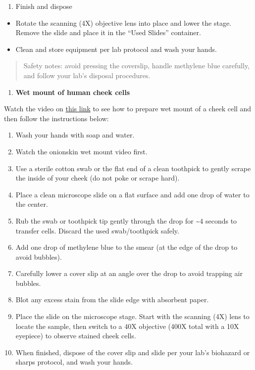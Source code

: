 \documentclass[
  letterpaper,
  DIV=11,
  numbers=noendperiod]{scrreprt}
\providecommand{\tightlist}{%
  \setlength{\itemsep}{0pt}\setlength{\parskip}{0pt}}
\begin{document}
\begin{enumerate}
\def\labelenumi{\arabic{enumi}.}
\setcounter{enumi}{6}
\tightlist
\item
  Finish and dispose
\end{enumerate}

\begin{itemize}
\item
  Rotate the scanning (4X) objective lens into place and lower the
  stage. Remove the slide and place it in the ``Used Slides'' container.
\item
  Clean and store equipment per lab protocol and wash your hands.
\end{itemize}

\begin{quote}
Safety notes: avoid pressing the coverslip, handle methylene blue
carefully, and follow your lab's disposal procedures.
\end{quote}

\begin{enumerate}
\def\labelenumi{\Roman{enumi}.}
\setcounter{enumi}{1}
\tightlist
\item
  \textbf{Wet mount of human cheek cells}
\end{enumerate}

Watch the video on
\href{Watch\%20the\%20video\%20on\%20this\%20link\%20to\%20see\%20how\%20to\%20prepare\%20wet\%20mount\%20of\%20an\%20onion\%20skin\%20and\%20then\%20follow\%20the\%20instructions\%20below:}{this
link} to see how to prepare wet mount of a cheek cell and then follow
the instructions below:

\begin{enumerate}
\def\labelenumi{\arabic{enumi}.}
\item
  Wash your hands with soap and water.
\item
  Watch the onionskin wet mount video first.
\item
  Use a sterile cotton swab or the flat end of a clean toothpick to
  gently scrape the inside of your cheek (do not poke or scrape hard).
\item
  Place a clean microscope slide on a flat surface and add one drop of
  water to the center.
\item
  Rub the swab or toothpick tip gently through the drop for
  \textasciitilde4 seconds to transfer cells. Discard the used
  swab/toothpick safely.
\item
  Add one drop of methylene blue to the smear (at the edge of the drop
  to avoid bubbles).
\item
  Carefully lower a cover slip at an angle over the drop to avoid
  trapping air bubbles.
\item
  Blot any excess stain from the slide edge with absorbent paper.
\item
  Place the slide on the microscope stage. Start with the scanning (4X)
  lens to locate the sample, then switch to a 40X objective (400X total
  with a 10X eyepiece) to observe stained cheek cells.
\item
  When finished, dispose of the cover slip and slide per your lab's
  biohazard or sharps protocol, and wash your hands.
\end{enumerate}
\end{document}
